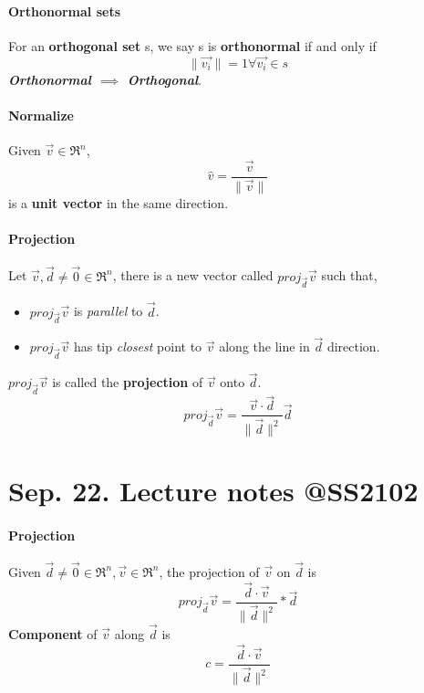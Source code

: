 \documentclass{article}
\begin{document}
	\paragraph{Orthonormal sets} For an \textbf{orthogonal set} s, we say s is \textbf{orthonormal} if and only if
	\[ \lVert \vec{v_i} \rVert = 1 \forall \vec{v_i} \in s
	\]
	\newline \emph{\textbf{Orthonormal $\implies$ Orthogonal}}.
	\paragraph{Normalize} Given $\vec{v} \in \Re^n$,
	\[
	\hat{v} = \frac{\vec{v}}{\lVert \vec{v} \rVert}
	\]
	is a \textbf{unit vector} in the same direction.
	\paragraph{Projection} Let $\vec{v},\vec{d}\neq\vec{0}\in\Re^n$, there is a new vector called $proj_{\vec{d}}\vec{v}$ such that,
	\begin{itemize}
		\item $proj_{\vec{d}}\vec{v}$ is \emph{parallel} to $\vec{d}$.
		\item $proj_{\vec{d}}\vec{v}$ has tip \emph{closest} point to $\vec{v}$ along the line in $\vec{d}$ direction.
	\end{itemize}
	$proj_{\vec{d}}\vec{v}$ is called the \textbf{projection} of $\vec{v}$ onto $\vec{d}$.
	\[
	proj_{\vec{d}}\vec{v} = \frac{\vec{v}\cdot\vec{d}}{\lVert \vec{d} \rVert ^ 2} \vec{d}
	\]
	
	\section{Sep. 22. Lecture notes @SS2102}
	\paragraph{Projection} Given $\vec{d} \neq \vec{0} \in \Re^n, \vec{v} \in \Re^n $, the projection of $\vec{v}$ on $\vec{d}$ is 
	\[ proj_{\vec{d}}\vec{v} = \frac{\vec{d}\cdot\vec{v}}{\lVert\vec{d}\rVert^2} * \vec{d}
	\]
	\newline \textbf{Component} of $\vec{v}$ along $\vec{d}$ is
	\[ c = \frac{\vec{d}\cdot\vec{v}}{\lVert\vec{d}\rVert^2}
	\]
\end{document}
